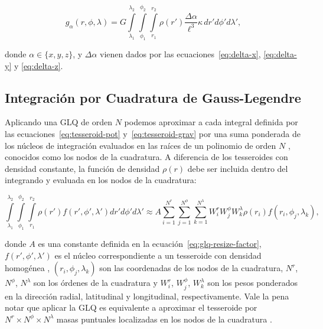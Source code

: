\begin{equation}
    g_{\alpha}(r,\phi,\lambda) = G
    \int\limits_{\lambda_1}^{\lambda_2}
    \int\limits_{\phi_1}^{\phi_2}
    \int\limits_{r_1}^{r_2}
    \rho(r') \frac{\Delta\alpha}{\ell^3}
    \kappa \, dr' d\phi' d\lambda',
\label{eq:tesseroid-grav}
\end{equation}

\noindent donde $\alpha \in \{x, y, z\}$, y $\Delta \alpha$ vienen dados por
las ecuaciones~\ref{eq:delta-x}, \ref{eq:delta-y} y \ref{eq:delta-z}.

\subsection{Integración por Cuadratura de Gauss-Legendre}

Aplicando una \ac{GLQ} de orden $N$ podemos aproximar a cada integral definida
por las ecuaciones~\ref{eq:tesseroid-pot} y~\ref{eq:tesseroid-grav} por una
suma ponderada de los núcleos de integración evaluados en las raíces de un
polinomio de orden $N$ \citep[p.~390]{hildebrand1987}, conocidos como los nodos
de la cuadratura.
A diferencia de los tesseroides con densidad constante, la función de densidad
$\rho(r)$ debe ser incluida dentro del integrando y evaluada en los nodos de la
cuadratura:

\begin{equation}
        \int\limits_{\lambda_1}^{\lambda_2}
        \int\limits_{\phi_1}^{\phi_2}
        \int\limits_{r_1}^{r_2}
        \rho(r') f(r', \phi', \lambda')
        dr' d\phi' d\lambda' \approx
        A
        \sum\limits_{i=1}^{N^r}
        \sum\limits_{j=1}^{N^\phi}
        \sum\limits_{k=1}^{N^\lambda}
        W_i^r W_j^\phi W_k^\lambda
        \rho(r_i) f(r_i, \phi_j, \lambda_k),
\label{eq:glq-var-dens}
\end{equation}

\noindent donde $A$ es una constante definida en la
ecuación~\ref{eq:glq-resize-factor}, $f(r', \phi', \lambda')$ es el núcleo
correspondiente a un tesseroide con densidad homogénea \citep{grombein2013},
$(r_i, \phi_j, \lambda_k)$ son las coordenadas de los nodos de la cuadratura,
$N^r$, $N^\phi$, $N^\lambda$ son los órdenes de la cuadratura y $W_i^r$,
$W_j^\phi$, $W_k^\lambda$ son los pesos ponderados en la dirección radial,
latitudinal y longitudinal, respectivamente.
Vale la pena notar que aplicar la \ac{GLQ} es equivalente a aproximar el
tesseroide por $N^r \times N^\phi \times N^\lambda$ masas puntuales localizadas
en los nodos de la cuadratura \citep{ku1977, asgharzadeh2007}.


